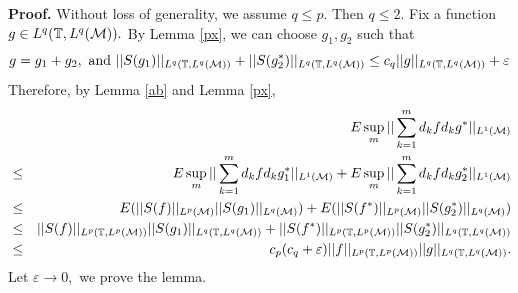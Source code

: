 {\bf Proof. } Without loss of generality, we assume  $q\leq p$. Then
$q\leq2$. Fix a function $g\in L^q({\mathbb T},L^q({\mathcal M})).$ By Lemma \ref{px},
we can choose $g_1,g_2$ such that
\[
g=g_1+g_2,\mbox{ and
}||S(g_1)||_{L^q({\mathbb T},L^q({\mathcal M}))}+||S(g_2^{*})||_{L^q({\mathbb T},L^q({\mathcal M}))}\leq
c_q||g||_{L^q({\mathbb T},L^q({\mathcal M}))}+\varepsilon
\]
Therefore, by Lemma \ref{ab} and Lemma \ref{px},
\begin{eqnarray*}
&&E\sup_m||\sum_{k=1}^md_kfd_kg^{*}||_{L^1(\M)}\\
&\leq& E\sup_m||%
\sum_{k=1}^md_kfd_kg_1^{*}||_{L^1(\M)}+E\sup_m||%
\sum_{k=1}^md_kfd_kg_2^{*}||_{L^1(\M)} \\
&\leq
&E(||S(f)||_{{L^p(\M)}}||S(g_1)||_{L^q(\M)})+E(||S(f^{*})||_{{L^p(\M)}}||S(g_2^{*})||_{L^q(\M)})
\\
&\leq
&||S(f)||_{L^p(\T,L^p(\M))}||S(g_1)||_{L^q(\T,L^q(\M))}+||S(f^{*})||_{L^p(\T,L^p(\M))}||S(g_2^{*})||_{L^q(\T,L^q(\M))}
\\
&\leq
&c_p(c_q+\varepsilon)||f||_{L^p(\T,L^p(\M))}||g||_{L^q(\T,L^q(\M))}.
\end{eqnarray*}
Let $\varepsilon \rightarrow 0,$ we prove the lemma.

\medskip

